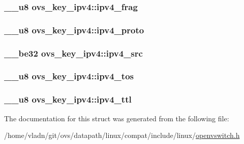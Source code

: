 \subsubsection[{ipv4\+\_\+frag}]{\setlength{\rightskip}{0pt plus 5cm}\+\_\+\+\_\+u8 ovs\+\_\+key\+\_\+ipv4\+::ipv4\+\_\+frag}\label{structovs__key__ipv4_a47225bcfead6875052b2678c96d3f9b3}
\hypertarget{structovs__key__ipv4_ac973a2efc8d310948e3713a5c5a7fabf}{}
\subsubsection[{ipv4\+\_\+proto}]{\setlength{\rightskip}{0pt plus 5cm}\+\_\+\+\_\+u8 ovs\+\_\+key\+\_\+ipv4\+::ipv4\+\_\+proto}\label{structovs__key__ipv4_ac973a2efc8d310948e3713a5c5a7fabf}
\hypertarget{structovs__key__ipv4_a3577eccaa5f978ba303d2424e3e31a13}{}
\subsubsection[{ipv4\+\_\+src}]{\setlength{\rightskip}{0pt plus 5cm}\+\_\+\+\_\+be32 ovs\+\_\+key\+\_\+ipv4\+::ipv4\+\_\+src}\label{structovs__key__ipv4_a3577eccaa5f978ba303d2424e3e31a13}
\hypertarget{structovs__key__ipv4_a0097feb04c0db1cc6621a58f74ac0e33}{}
\subsubsection[{ipv4\+\_\+tos}]{\setlength{\rightskip}{0pt plus 5cm}\+\_\+\+\_\+u8 ovs\+\_\+key\+\_\+ipv4\+::ipv4\+\_\+tos}\label{structovs__key__ipv4_a0097feb04c0db1cc6621a58f74ac0e33}
\hypertarget{structovs__key__ipv4_ac2142e7329a6e522b3a0d504bec22678}{}
\subsubsection[{ipv4\+\_\+ttl}]{\setlength{\rightskip}{0pt plus 5cm}\+\_\+\+\_\+u8 ovs\+\_\+key\+\_\+ipv4\+::ipv4\+\_\+ttl}\label{structovs__key__ipv4_ac2142e7329a6e522b3a0d504bec22678}


The documentation for this struct was generated from the following file\+:\begin{DoxyCompactItemize}
\item 
/home/vladn/git/ovs/datapath/linux/compat/include/linux/\hyperlink{openvswitch_8h}{openvswitch.\+h}\end{DoxyCompactItemize}
